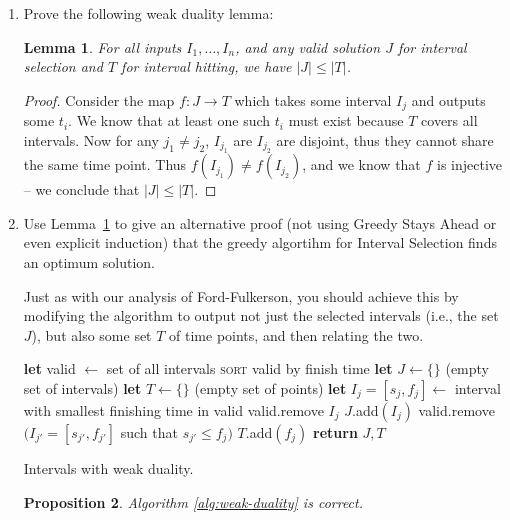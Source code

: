 \documentclass[10pt]{article}
\newtheorem{lemma}{Lemma}
\newtheorem{proposition}[lemma]{Proposition}
\begin{document}
  \begin{enumerate}
  \item Prove the following weak duality lemma:
    \begin{lemma} \label{lem:interval-duality}
      For all inputs $I_1, \ldots, I_n$, and any valid solution $J$ for interval selection and $T$ for interval hitting, we have $|J| \leq |T|$.
    \end{lemma}

    \begin{proof}
      Consider the map \(f : J \to T\) which takes some interval \(I_j\) and outputs some \(t_i\). We know that at least one such \(t_i\) must exist because \(T\) covers all intervals. Now for any \(j_1 \neq j_2\), \(I_{j_1}\) are \(I_{j_2}\) are disjoint, thus they cannot share the same time point. Thus \(f(I_{j_1}) \neq f(I_{j_2})\), and we know that \(f\) is injective -- we conclude that \(|J| \leq |T|\).
    \end{proof}

  \item Use Lemma~\ref{lem:interval-duality} to give an alternative proof (not using Greedy Stays Ahead or even explicit induction) that the greedy algortihm for Interval Selection finds an optimum solution.

    Just as with our analysis of Ford-Fulkerson, you should achieve this by modifying the algorithm to output not just the selected intervals (i.e., the set $J$), but also some set $T$ of time points, and then relating the two.
    
    
\begin{algorithm}[htb]
  \begin{algorithmic}
    \STATE \textbf{let} valid \(\gets\) set of all intervals
    \STATE \textsc{sort} valid by finish time
    \STATE \textbf{let} \(J \gets \{\}\) (empty set of intervals)
    \STATE \textbf{let} \(T \gets \{\}\) (empty set of points)
      \STATE \textbf{let} \(I_j = [s_j, f_j] \gets\) interval with smallest finishing time in valid
      \STATE valid.remove \(I_j\)
      \STATE \(J\).add\((I_j)\)
      \STATE valid.remove \((I_{j'} = [s_{j'}, f_{j'}]\) such that \(s_{j'} \leq f_{j})\)
      \STATE \(T\).add\((f_j)\)
    \ENDWHILE
    \STATE \textbf{return} \(J, T\)
  \end{algorithmic}
  \caption{Intervals with weak duality. \label{alg:weak-duality}}
\end{algorithm}

\begin{proposition}
  Algorithm \ref{alg:weak-duality} is correct. 
\end{proposition}


\end{enumerate}
\end{document}
